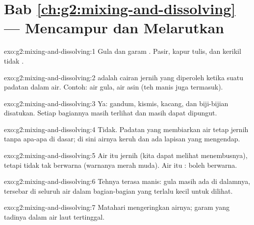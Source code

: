 \section*{Bab \ref{ch:g2:mixing-and-dissolving} --- Mencampur dan Melarutkan}

\begin{solution}{exo:g2:mixing-and-dissolving:1}
Gula dan garam . Pasir, kapur tulis, dan kerikil tidak .
\end{solution}

\begin{solution}{exo:g2:mixing-and-dissolving:2}
 adalah cairan jernih yang diperoleh ketika suatu padatan 
dalam air. Contoh: air gula, air asin (teh manis juga termasuk).
\end{solution}

\begin{solution}{exo:g2:mixing-and-dissolving:3}
Ya: gandum, kismis, kacang, dan biji-bijian disatukan. Setiap bagiannya
masih terlihat dan masih dapat dipungut.
\end{solution}

\begin{solution}{exo:g2:mixing-and-dissolving:4}
Tidak. Padatan yang  membiarkan air tetap jernih tanpa apa-apa di
dasar; di sini airnya keruh dan ada lapisan yang mengendap.
\end{solution}

\begin{solution}{exo:g2:mixing-and-dissolving:5}
Air itu jernih (kita dapat melihat menembusnya), tetapi tidak tak
berwarna (warnanya merah muda). Air itu :  boleh berwarna.
\end{solution}

\begin{solution}{exo:g2:mixing-and-dissolving:6}
Tehnya terasa manis: gula masih ada di dalamnya, tersebar di seluruh air
dalam bagian-bagian yang terlalu kecil untuk dilihat.
\end{solution}

\begin{solution}{exo:g2:mixing-and-dissolving:7}
Matahari mengeringkan airnya; garam yang tadinya  dalam air laut
tertinggal.
\end{solution}

